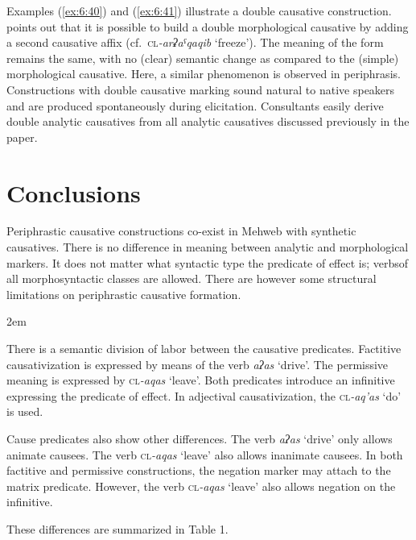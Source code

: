 ﻿\documentclass[output=paper]{langsci/langscibook}
\begin{document}
Examples (\ref{ex:6:40}) and (\ref{ex:6:41}) illustrate a double causative construction.
\citet[10]{ageeva2014} points out that it is possible to build a double
morphological causative by adding a second causative affix (cf.\
\textsc{cl}\emph{-arʡaˤqaqib} `freeze'). The meaning of the form remains the same,
with no (clear) semantic change as compared to the (simple)
morphological causative. Here, a similar phenomenon is observed in
periphrasis. Constructions with double causative marking sound natural
to native speakers and are produced spontaneously during elicitation.
Consultants easily derive double analytic causatives from all analytic
causatives discussed previously in the paper.
%



\section{Conclusions}

Periphrastic causative constructions co-exist in Mehweb with synthetic
causa\-tives. There is no difference in meaning between analytic and
morphological markers. It does not matter what syntactic type the
predicate of effect is; verbs\pagebreak[3] of all morphosyntactic classes are
allowed. There are however some structural limitations on periphrastic
causative formation.
{\emergencystretch2em\par}

There is a semantic division of labor between the causative predicates.
Factitive causativization is expressed by means of the verb \emph{aʔas}
`drive'. The permissive meaning is expressed by \textsc{cl}\emph{-aqas}
`leave'. Both predicates introduce an infinitive expressing the
predicate of effect. In adjectival causativization, the
\textsc{cl}\emph{-aq'as} `do' is used.

Cause predicates also show other differences. The verb \emph{aʔas}
`drive' only allows animate causees. The verb \textsc{cl}\emph{-aqas}
`leave' also allows inanimate causees. In both factitive and permissive
constructions, the negation marker may attach to the matrix predicate.
However, the verb \textsc{cl}\emph{-aqas} `leave' also allows negation
on the infinitive.


These differences are summarized in Table 1.
\end{document}
